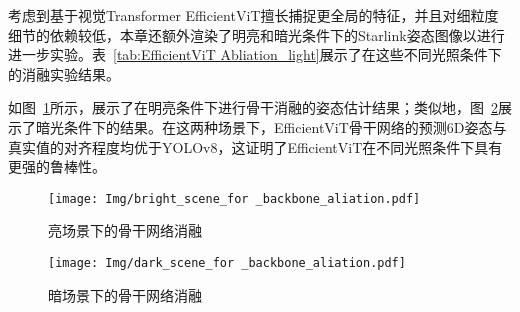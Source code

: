 考虑到基于视觉Transformer EfficientViT擅长捕捉更全局的特征，并且对细粒度细节的依赖较低，本章还额外渲染了明亮和暗光条件下的Starlink姿态图像以进行进一步实验。表~\ref{tab:EfficientViT Abliation_light}展示了在这些不同光照条件下的消融实验结果。

如图~\ref{fig:bright_scene_comp}所示，展示了在明亮条件下进行骨干消融的姿态估计结果；类似地，图~\ref{fig:dark_scene_comp}展示了暗光条件下的结果。在这两种场景下，EfficientViT骨干网络的预测6D姿态与真实值的对齐程度均优于YOLOv8，这证明了EfficientViT在不同光照条件下具有更强的鲁棒性。

\begin{table}[!htbp]
	\centering
	\caption{在明暗场景下的骨干网络消融}
	\label{tab:EfficientViT Abliation_light}
	{%
	}
\end{table}


\begin{figure}[htbp]
	\centering
	\texttt{[image: Img/bright\_scene\_for \_backbone\_aliation.pdf]}
	\caption{亮场景下的骨干网络消融}
	\label{fig:bright_scene_comp}
	\vspace{-3ex}
\end{figure}



\begin{figure}[htbp]
	\centering
	\texttt{[image: Img/dark\_scene\_for \_backbone\_aliation.pdf]}
	\caption{暗场景下的骨干网络消融}
	\label{fig:dark_scene_comp}
	\vspace{-3ex}
\end{figure}



\vspace{12pt}
